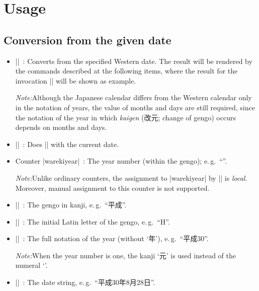 \documentclass[a4paper]{article}
\newcommand{\Meta}[1]{$\langle$\textit{#1}$\rangle$}
\newcommand{\Note}{\par\noindent\emph{Note:}\quad}
\newcommand{\Eg}{e.\,g.}
\newcommand{\Means}{~:\quad}
\newcommand*{\Ja}[1]{{\fIpaex#1}}
\newcommand*{\+}{\hspace{0.25em minus 0.25em}}
\begin{document}
\section{Usage}
\label{sec:Usage}

\subsection{Conversion from the given date}

\begin{itemize}
\item |\warekisetdate{|\Meta{year}|}{|\Meta{month}|}{|\Meta{day}|}|\Means
  Converts from the specified Western date.
  The result will be rendered by the commands described
  at the following items, where the result for the invocation
  ||
  will be shown as example.

  \Note Although the Japanese calendar differs from the Western calendar
  only in the notation of years,
  the value of months and days are still required,
  since the notation of the year in which
  \emph{kaigen} (\Ja{改元}; change of gengo)
  occurs depends on months and days.

\item |\warekisettoday|\Means
  Does |\warekisetdate| with the current date.

\item Counter |warekiyear|\Means
  The year number (within the gengo); \Eg~``\Ja{30}''.

  \Note Unlike ordinary counters,
  the assignment to |warekiyear| by |\warekisetdate| is \emph{local}.
  Moreover, manual assignment to this counter is not supported.

\item |\warekigengo|\Means
  The gengo in kanji, \Eg~``\Ja{平成}''.

\item |\warekigengoinitial|\Means
  The initial Latin letter of the gengo, \Eg~``\Ja{H}''.

\item |\warekiyear|\Means
  The full notation of the year (without `\Ja{年}'),
  \Eg~``\Ja{平成\+30}''.

  \Note When the year number is one,
  the kanji `\Ja{元}' is used instead of the numeral `\Ja{1}'.

\item |\warekidate|\Means
  The date string, \Eg~``\Ja{平成\+30\+年\+8\+月\+28\+日}''.


\end{itemize}
\end{document}
